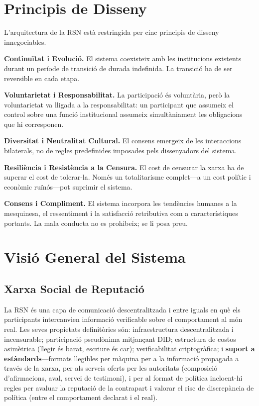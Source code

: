 \documentclass[11pt,a4paper,twocolumn]{article}
\begin{document}
\section{Principis de Disseny}

L'arquitectura de la RSN està restringida per cinc principis de disseny innegociables.

\textbf{Continuïtat i Evolució.} El sistema coexisteix amb les institucions existents durant un període de transició de durada indefinida. La transició ha de ser reversible en cada etapa.

\textbf{Voluntarietat i Responsabilitat.} La participació és voluntària, però la voluntarietat va lligada a la responsabilitat: un participant que assumeix el control sobre una funció institucional assumeix simultàniament les obligacions que hi corresponen.

\textbf{Diversitat i Neutralitat Cultural.} El consens emergeix de les interaccions bilaterals, no de regles predefinides imposades pels dissenyadors del sistema.

\textbf{Resiliència i Resistència a la Censura.} El cost de censurar la xarxa ha de superar el cost de tolerar-la. Només un totalitarisme complet---a un cost polític i econòmic ruïnós---pot suprimir el sistema.

\textbf{Consens i Compliment.} El sistema incorpora les tendències humanes a la mesquinesa, el ressentiment i la satisfacció retributiva com a característiques portants. La mala conducta no es prohibeix; se li posa preu.

\section{Visió General del Sistema}

\subsection{Xarxa Social de Reputació}

La RSN és una capa de comunicació descentralitzada i entre iguals en què els participants intercanvien informació verificable sobre el comportament al món real. Les seves propietats definitòries són: infraestructura descentralitzada i incensurable; participació pseudònima mitjançant DID; estructura de costos asimètrica (llegir és barat, escriure és car); verificabilitat criptogràfica; i \textbf{suport a estàndards}---formats llegibles per màquina per a la informació propagada a través de la xarxa, per als serveis oferts per les autoritats (composició d'afirmacions, aval, servei de testimoni), i per al format de política incloent-hi regles per avaluar la reputació de la contrapart i valorar el risc de discrepància de política (entre el comportament declarat i el real).
\end{document}
